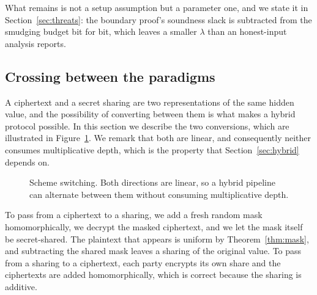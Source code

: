 \documentclass[11pt]{article}
\begin{document}
What remains is not a setup assumption but a parameter one, and we state it in
Section~\ref{sec:threats}: the boundary proof's soundness slack is subtracted from the smudging
budget bit for bit, which leaves a smaller $\lambda$ than an honest-input analysis reports.

\subsection{Crossing between the paradigms}
\label{sec:prelim:switch}

A ciphertext and a secret sharing are two representations of the same hidden value, and the
possibility of converting between them is what makes a hybrid protocol possible. In this
section we describe the two conversions, which are illustrated in
Figure~\ref{fig:switch}. We remark that both are linear, and consequently neither consumes
multiplicative depth, which is the property that Section~\ref{sec:hybrid} depends on.

\begin{figure}[t]
\centering
{}
\caption{Scheme switching. Both directions are linear, so a hybrid pipeline can alternate
between them without consuming multiplicative depth.}
\label{fig:switch}
\end{figure}

To pass from a ciphertext to a sharing, we add a fresh random mask homomorphically, we decrypt
the masked ciphertext, and we let the mask itself be secret-shared. The plaintext that appears
is uniform by Theorem~\ref{thm:mask}, and subtracting the shared mask leaves a sharing of the
original value. To pass from a sharing to a ciphertext, each party encrypts its own share and
the ciphertexts are added homomorphically, which is correct because the sharing is additive.
\end{document}
